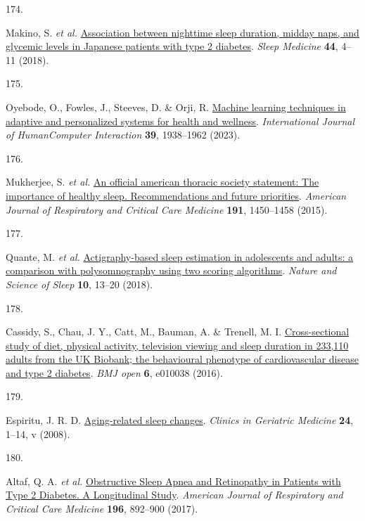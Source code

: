 \documentclass[
  10pt,
]{scrbook}
\newlength{\cslhangindent}
\newlength{\csllabelwidth}
\newlength{\cslentryspacingunit} %
\newenvironment{CSLReferences}[2] %
 {%
  \setlength{\parindent}{0pt}
  \ifodd #1
  \let\oldpar\par
  \def\par{\hangindent=\cslhangindent\oldpar}
  \fi
  \setlength{\parskip}{#2\cslentryspacingunit}
 }%
 {}
\newcommand{\CSLLeftMargin}[1]{\parbox[t]{\csllabelwidth}{#1}}
\newcommand{\CSLRightInline}[1]{\parbox[t]{\linewidth - \csllabelwidth}{#1}\break}
\let\originaltextbf\textbf
\renewcommand{\textbf}[1]{\textcolor{color1}{\textsf{\originaltextbf{#1}}}}
\begin{document}
\begin{CSLReferences}{0}{0}
\leavevmode{}%
\CSLLeftMargin{174. }%
\CSLRightInline{Makino, S. \emph{et al.}
\href{https://doi.org/10.1016/j.sleep.2017.11.1124}{Association between
nighttime sleep duration, midday naps, and glycemic levels in Japanese
patients with type 2 diabetes}. \emph{Sleep Medicine} \textbf{44}, 4--11
(2018).}

\leavevmode{}%
\CSLLeftMargin{175. }%
\CSLRightInline{Oyebode, O., Fowles, J., Steeves, D. \& Orji, R.
\href{https://doi.org/10.1080/10447318.2022.2089085}{Machine learning
techniques in adaptive and personalized systems for health and
wellness}. \emph{International Journal of Human{\textendash}Computer
Interaction} \textbf{39}, 1938--1962 (2023).}

\leavevmode{}%
\CSLLeftMargin{176. }%
\CSLRightInline{Mukherjee, S. \emph{et al.}
\href{https://doi.org/10.1164/rccm.201504-0767ST}{An official american
thoracic society statement: The importance of healthy sleep.
Recommendations and future priorities}. \emph{American Journal of
Respiratory and Critical Care Medicine} \textbf{191}, 1450--1458
(2015).}

\leavevmode{}%
\CSLLeftMargin{177. }%
\CSLRightInline{Quante, M. \emph{et al.}
\href{https://doi.org/10.2147/NSS.S151085}{Actigraphy-based sleep
estimation in adolescents and adults: a comparison with polysomnography
using two scoring algorithms}. \emph{Nature and Science of Sleep}
\textbf{10}, 13--20 (2018).}

\leavevmode{}%
\CSLLeftMargin{178. }%
\CSLRightInline{Cassidy, S., Chau, J. Y., Catt, M., Bauman, A. \&
Trenell, M. I.
\href{https://doi.org/10.1136/bmjopen-2015-010038}{Cross-sectional study
of diet, physical activity, television viewing and sleep duration in
233,110 adults from the UK Biobank; the behavioural phenotype of
cardiovascular disease and type 2 diabetes}. \emph{BMJ open} \textbf{6},
e010038 (2016).}

\leavevmode{}%
\CSLLeftMargin{179. }%
\CSLRightInline{Espiritu, J. R. D.
\href{https://doi.org/10.1016/j.cger.2007.08.007}{Aging-related sleep
changes}. \emph{Clinics in Geriatric Medicine} \textbf{24}, 1--14, v
(2008).}

\leavevmode{}%
\CSLLeftMargin{180. }%
\CSLRightInline{Altaf, Q. A. \emph{et al.}
\href{https://doi.org/10.1164/rccm.201701-0175OC}{Obstructive Sleep
Apnea and Retinopathy in Patients with Type 2 Diabetes. A Longitudinal
Study}. \emph{American Journal of Respiratory and Critical Care
Medicine} \textbf{196}, 892--900 (2017).}


\end{CSLReferences}
\end{document}
